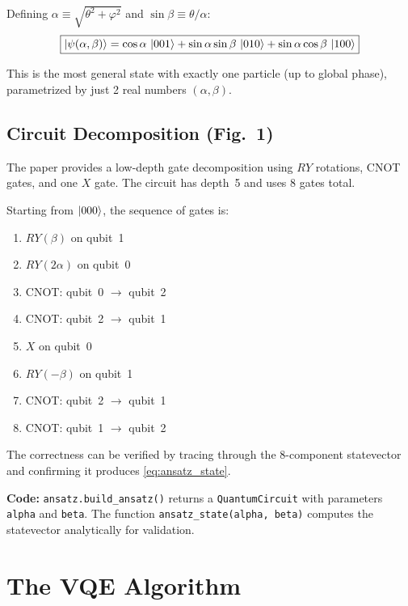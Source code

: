\documentclass[11pt,a4paper]{article}
\begin{document}
Defining $\alpha \equiv \sqrt{\theta^2 + \varphi^2}$ and $\sin\beta \equiv \theta/\alpha$:
\begin{equation}
  \boxed{
    \ket{\psi(\alpha,\beta)} = \cos\alpha\,\ket{001}
      + \sin\alpha\sin\beta\,\ket{010}
      + \sin\alpha\cos\beta\,\ket{100}
  }
  \label{eq:ansatz_state}
\end{equation}

This is the most general state with exactly one particle (up to global phase), parametrized by just 2 real numbers $(\alpha, \beta)$.

\subsection{Circuit Decomposition (Fig.~1)}

The paper provides a low-depth gate decomposition using $RY$ rotations, CNOT gates, and one $X$ gate. The circuit has depth~5 and uses 8 gates total.

Starting from $\ket{000}$, the sequence of gates is:
\begin{enumerate}[nosep]
  \item $RY(\beta)$ on qubit~1
  \item $RY(2\alpha)$ on qubit~0
  \item CNOT: qubit~0 $\to$ qubit~2
  \item CNOT: qubit~2 $\to$ qubit~1
  \item $X$ on qubit~0
  \item $RY(-\beta)$ on qubit~1
  \item CNOT: qubit~2 $\to$ qubit~1
  \item CNOT: qubit~1 $\to$ qubit~2
\end{enumerate}

The correctness can be verified by tracing through the 8-component statevector and confirming it produces \eqref{eq:ansatz_state}.

\vspace{0.3em}
\noindent\textbf{Code:} \texttt{ansatz.build\_ansatz()} returns a \texttt{QuantumCircuit} with parameters \texttt{alpha} and \texttt{beta}. The function \texttt{ansatz\_state(alpha, beta)} computes the statevector analytically for validation.


\section{The VQE Algorithm}
\end{document}

